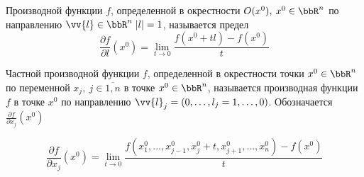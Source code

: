 \begin{defn}
Производной функции $f$, определенной в окрестности $O(x^0), \: x^0 \in \bbR^n$ по направлению $\vv{l} \in \bbR^n \; |l| = 1$, называется предел
$$
\frac{\partial f}{\partial l}(x^0) = \lim\limits_{t \to 0} \frac{f(x^0 + tl) - f(x^0)}{t}
$$
\end{defn}

\begin{defn}
Частной производной функции $f$, определенной в окрестности точки $x^0 \in \bbR^n$ по переменной $x_j, \: j \in \overline{1,n}$ в точке $x^0 \in \bbR^n$, называется производная функции $f$ в точке $x^0$ по направлению $\vv{l}_j = (0, \ldots, l_j = 1, \ldots, 0)$. Обозначается $\frac{\partial f}{\partial x_j}(x^0)$

$$
\frac{\partial f}{\partial x_j}(x^0) = \lim\limits_{t \to 0} \frac{f(x^0_1, \ldots, x^0_{j - 1}, x^0_j + t, x^0_{j + 1}, \ldots, x^0_n) - f(x^0)}{t}  
$$
\end{defn}


